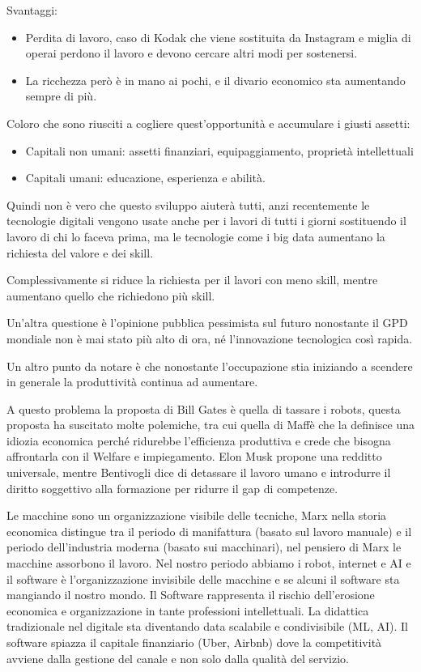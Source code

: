 \documentclass[a4page, 11pt]{article}
\begin{document}
Svantaggi:

\begin{itemize}
	 
	\item
	Perdita di lavoro, caso di Kodak che viene sostituita da Instagram e
	miglia di operai perdono il lavoro e devono cercare altri modi per
	sostenersi.
	\item
	La ricchezza però è in mano ai pochi, e il divario economico sta
	aumentando sempre di più.
\end{itemize}

Coloro che sono riusciti a cogliere quest'opportunità e accumulare i
giusti assetti:

\begin{itemize}
	 
	\item
	Capitali non umani: assetti finanziari, equipaggiamento, proprietà
	intellettuali
	\item
	Capitali umani: educazione, esperienza e abilità.
\end{itemize}

Quindi non è vero che questo sviluppo aiuterà tutti, anzi recentemente
le tecnologie digitali vengono usate anche per i lavori di tutti i
giorni sostituendo il lavoro di chi lo faceva prima, ma le tecnologie
come i big data aumentano la richiesta del valore e dei skill.

Complessivamente si riduce la richiesta per il lavori con meno skill,
mentre aumentano quello che richiedono più skill.

Un'altra questione è l'opinione pubblica pessimista sul futuro
nonostante il GPD mondiale non è mai stato più alto di ora, né
l'innovazione tecnologica così rapida.

Un altro punto da notare è che nonostante l'occupazione stia iniziando a
scendere in generale la produttività continua ad aumentare.

A questo problema la proposta di Bill Gates è quella di tassare i
robots, questa proposta ha suscitato molte polemiche, tra cui quella di
Maffè che la definisce una idiozia economica perché ridurebbe
l'efficienza produttiva e crede che bisogna affrontarla con il Welfare e
impiegamento. Elon Musk propone una redditto universale, mentre
Bentivogli dice di detassare il lavoro umano e introdurre il diritto
soggettivo alla formazione per ridurre il gap di competenze.

Le macchine sono un organizzazione visibile delle tecniche, Marx nella
storia economica distingue tra il periodo di manifattura (basato sul
lavoro manuale) e il periodo dell'industria moderna (basato sui
macchinari), nel pensiero di Marx le macchine assorbono il lavoro. Nel
nostro periodo abbiamo i robot, internet e AI e il software è
l'organizzazione invisibile delle macchine e se alcuni il software sta
mangiando il nostro mondo. Il Software rappresenta il rischio
dell'erosione economica e organizzazione in tante professioni
intellettuali. La didattica tradizionale nel digitale sta diventando
data scalabile e condivisibile (ML, AI). Il software spiazza il capitale
finanziario (Uber, Airbnb) dove la competitività avviene dalla gestione
del canale e non solo dalla qualità del servizio.
\end{document}
